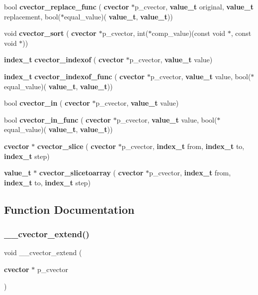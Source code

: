 \begin{DoxyCompactItemize}
\item 
bool \textbf{ cvector\+\_\+replace\+\_\+func} (\textbf{ cvector} $\ast$p\+\_\+cvector, \textbf{ value\+\_\+t} original, \textbf{ value\+\_\+t} replacement, bool($\ast$equal\+\_\+value)(\textbf{ value\+\_\+t}, \textbf{ value\+\_\+t}))
\item 
void \textbf{ cvector\+\_\+sort} (\textbf{ cvector} $\ast$p\+\_\+cvector, int($\ast$comp\+\_\+value)(const void $\ast$, const void $\ast$))
\item 
\textbf{ index\+\_\+t} \textbf{ cvector\+\_\+indexof} (\textbf{ cvector} $\ast$p\+\_\+cvector, \textbf{ value\+\_\+t} value)
\item 
\textbf{ index\+\_\+t} \textbf{ cvector\+\_\+indexof\+\_\+func} (\textbf{ cvector} $\ast$p\+\_\+cvector, \textbf{ value\+\_\+t} value, bool($\ast$equal\+\_\+value)(\textbf{ value\+\_\+t}, \textbf{ value\+\_\+t}))
\item 
bool \textbf{ cvector\+\_\+in} (\textbf{ cvector} $\ast$p\+\_\+cvector, \textbf{ value\+\_\+t} value)
\item 
bool \textbf{ cvector\+\_\+in\+\_\+func} (\textbf{ cvector} $\ast$p\+\_\+cvector, \textbf{ value\+\_\+t} value, bool($\ast$equal\+\_\+value)(\textbf{ value\+\_\+t}, \textbf{ value\+\_\+t}))
\item 
\textbf{ cvector} $\ast$ \textbf{ cvector\+\_\+slice} (\textbf{ cvector} $\ast$p\+\_\+cvector, \textbf{ index\+\_\+t} from, \textbf{ index\+\_\+t} to, \textbf{ index\+\_\+t} step)
\item 
\textbf{ value\+\_\+t} $\ast$ \textbf{ cvector\+\_\+slicetoarray} (\textbf{ cvector} $\ast$p\+\_\+cvector, \textbf{ index\+\_\+t} from, \textbf{ index\+\_\+t} to, \textbf{ index\+\_\+t} step)
\end{DoxyCompactItemize}


\subsection{Function Documentation}
\mbox{\label{cvector__core_8h_afa75ec5b8e81cc3d4e18298f8792f5a2}} 
\subsubsection{\+\_\+\+\_\+cvector\+\_\+extend()}
{\footnotesize\ttfamily void \+\_\+\+\_\+cvector\+\_\+extend (\begin{DoxyParamCaption}\item[{\textbf{ cvector} $\ast$}]{p\+\_\+cvector }\end{DoxyParamCaption})}

